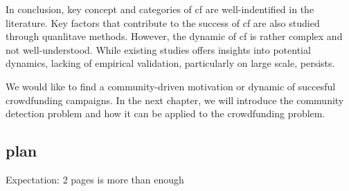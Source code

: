 In conclusion, key concept and categories of \acrshort{cf} are well-indentified in the literature.
Key factors that contribute to the success of \acrshort{cf} are also studied through quanlitave methods.
However, the dynamic of \acrshort{cf} is rather complex and not well-understood.
While existing studies offers insights into potential dynamics, lacking of empirical validation, particularly on large scale, persists.

We would like to find a community-driven motivation or dynamic of succesful crowdfunding campaigns.
In the next chapter, we will introduce the community detection problem and how it can be applied to the crowdfunding problem.

\subsection{plan}

Expectation: 2 pages is more than enough


